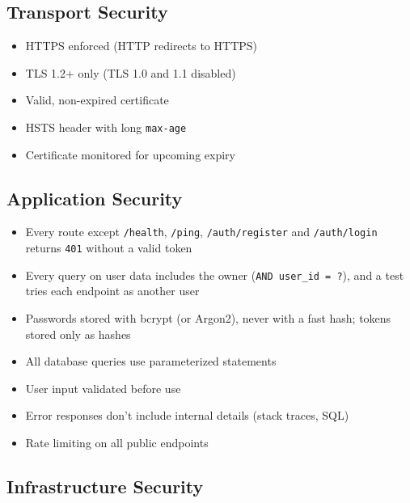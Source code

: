 \subsection*{Transport Security}\label{38-security:transport-security}

\begin{itemize}
\tightlist
\item[$\square$]
  HTTPS enforced (HTTP redirects to HTTPS)
\item[$\square$]
  TLS 1.2+ only (TLS 1.0 and 1.1 disabled)
\item[$\square$]
  Valid, non-expired certificate
\item[$\square$]
  HSTS header with long \texttt{max-age}
\item[$\square$]
  Certificate monitored for upcoming expiry
\end{itemize}

\subsection*{Application Security}\label{38-security:application-security}

\begin{itemize}
\tightlist
\item[$\square$]
  Every route except \texttt{/health}, \texttt{/ping}, \texttt{/auth/register} and \texttt{/auth/login} returns \texttt{401} without a valid token
\item[$\square$]
  Every query on user data includes the owner (\texttt{AND\ user\_id\ =\ ?}), and a test tries each endpoint as another user
\item[$\square$]
  Passwords stored with bcrypt (or Argon2), never with a fast hash; tokens stored only as hashes
\item[$\square$]
  All database queries use parameterized statements
\item[$\square$]
  User input validated before use
\item[$\square$]
  Error responses don't include internal details (stack traces, SQL)
\item[$\square$]
  Rate limiting on all public endpoints
\end{itemize}

\subsection*{Infrastructure Security}\label{38-security:infrastructure-security}

